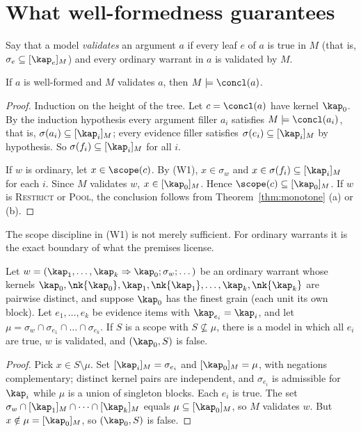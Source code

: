 \section{What well-formedness guarantees}

Say that a model \emph{validates} an argument $a$ if every leaf $e$ of $a$ is true in $M$ (that is, $\sigma_e\subseteq[\kap_e]_M$) and every ordinary warrant in $a$ is validated by $M$.

\begin{theorem}\label{thm:sound}
If $a$ is well-formed and $M$ validates $a$, then $M\models\concl(a)$.
\end{theorem}

\begin{proof}
Induction on the height of the tree. Let $c=\concl(a)$ have kernel $\kap_0$. By the induction hypothesis every argument filler $a_i$ satisfies $M\models\concl(a_i)$, that is, $\sigma(a_i)\subseteq[\kap_i]_M$; every evidence filler satisfies $\sigma(e_i)\subseteq[\kap_i]_M$ by hypothesis. So $\sigma(f_i)\subseteq[\kap_i]_M$ for all $i$.

If $w$ is ordinary, let $x\in\scope(c)$. By (W1), $x\in\sigma_w$ and $x\in\sigma(f_i)\subseteq[\kap_i]_M$ for each $i$. Since $M$ validates $w$, $x\in[\kap_0]_M$. Hence $\scope(c)\subseteq[\kap_0]_M$. If $w$ is \textsc{Restrict} or \textsc{Pool}, the conclusion follows from Theorem~\ref{thm:monotone} (a) or (b).
\end{proof}

The scope discipline in (W1) is not merely sufficient. For ordinary warrants it is the exact boundary of what the premises license.

\begin{theorem}\label{thm:tight}
Let $w=(\kap_1,\dots,\kap_k\Rightarrow\kap_0;\sigma_w;\dots)$ be an ordinary warrant whose kernels $\kap_0,\nk{\kap_0},\kap_1,\nk{\kap_1},\dots,\kap_k,\nk{\kap_k}$ are pairwise distinct, and suppose $\kap_0$ has the finest grain (each unit its own block). Let $e_1,\dots,e_k$ be evidence items with $\kap_{e_i}=\kap_i$, and let $\mu=\sigma_w\cap\sigma_{e_1}\cap\dots\cap\sigma_{e_k}$. If $S$ is a scope with $S\not\subseteq\mu$, there is a model in which all $e_i$ are true, $w$ is validated, and $(\kap_0,S)$ is false.
\end{theorem}

\begin{proof}
Pick $x\in S\setminus\mu$. Set $[\kap_i]_M=\sigma_{e_i}$ and $[\kap_0]_M=\mu$, with negations complementary; distinct kernel pairs are independent, and $\sigma_{e_i}$ is admissible for $\kap_i$ while $\mu$ is a union of singleton blocks. Each $e_i$ is true. The set $\sigma_w\cap[\kap_1]_M\cap\dots\cap[\kap_k]_M$ equals $\mu\subseteq[\kap_0]_M$, so $M$ validates $w$. But $x\notin\mu=[\kap_0]_M$, so $(\kap_0,S)$ is false.
\end{proof}

